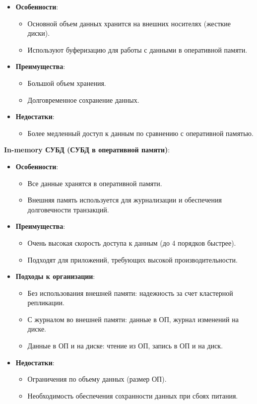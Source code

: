\documentclass[a4paper,12pt]{article}
\begin{document}
\begin{itemize}
    \item \textbf{Особенности}:
    \begin{itemize}
        \item Основной объем данных хранится на внешних носителях (жесткие диски).
        \item Используют буферизацию для работы с данными в оперативной памяти.
    \end{itemize}
    \item \textbf{Преимущества}:
    \begin{itemize}
        \item Большой объем хранения.
        \item Долговременное сохранение данных.
    \end{itemize}
    \item \textbf{Недостатки}:
    \begin{itemize}
        \item Более медленный доступ к данным по сравнению с оперативной памятью.
    \end{itemize}
\end{itemize}

\textbf{In-memory СУБД (СУБД в оперативной памяти)}:

\begin{itemize}
    \item \textbf{Особенности}:
    \begin{itemize}
        \item Все данные хранятся в оперативной памяти.
        \item Внешняя память используется для журнализации и обеспечения долговечности транзакций.
    \end{itemize}
    \item \textbf{Преимущества}:
    \begin{itemize}
        \item Очень высокая скорость доступа к данным (до 4 порядков быстрее).
        \item Подходят для приложений, требующих высокой производительности.
    \end{itemize}
    \item \textbf{Подходы к организации}:
    \begin{itemize}
        \item Без использования внешней памяти: надежность за счет кластерной репликации.
        \item С журналом во внешней памяти: данные в ОП, журнал изменений на диске.
        \item Данные в ОП и на диске: чтение из ОП, запись в ОП и на диск.
    \end{itemize}
    \item \textbf{Недостатки}:
    \begin{itemize}
        \item Ограничения по объему данных (размер ОП).
        \item Необходимость обеспечения сохранности данных при сбоях питания.
    \end{itemize}
\end{itemize}
\end{document}
